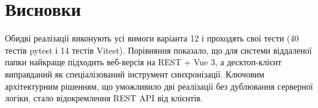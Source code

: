 \documentclass[12pt,a4paper]{article}
\begin{document}
\section{Висновки}

Обидві реалізації виконують усі вимоги варіанта 12 і проходять свої тести (40 тестів pytest і 14 тестів Vitest). Порівняння показало, що для системи віддаленої папки найкраще підходить веб-версія на REST + Vue 3, а десктоп-клієнт виправданий як спеціалізований інструмент синхронізації. Ключовим архітектурним рішенням, що уможливило дві реалізації без дублювання серверної логіки, стало відокремлення REST API від клієнтів.
\end{document}
